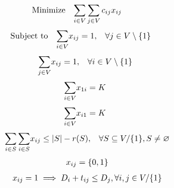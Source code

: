 \begin{equation}
    \begin{array}{ll@{}ll}
        \text{Minimize} & \displaystyle\sum\limits_{i \in V}\sum\limits_{j \in V} c_{ij}&x_{ij} &\\
    \end{array}
\end{equation}
\begin{equation}
    \begin{array}{ll@{}ll}
        \text{Subject to}&\displaystyle\sum\limits_{i \in V}   &x_{ij} = 1,  &\forall j \in V \setminus \{1\}\\
    \end{array}
\end{equation}
\begin{equation}
    \begin{array}{ll@{}ll}
        & \displaystyle\sum\limits_{j \in V}   &x_{ij} = 1,  &\forall i \in V \setminus \{1\}\\
    \end{array}
\end{equation}
\begin{equation}
    \begin{array}{ll@{}ll}
        & \displaystyle\sum\limits_{i \in V}   &x_{1i} = K\\
    \end{array}
\end{equation}
\begin{equation}
    \begin{array}{ll@{}ll}
        & \displaystyle\sum\limits_{i \in V}   &x_{i1} = K\\
    \end{array}
\end{equation}
\begin{equation}
    \begin{array}{ll@{}ll@{}ll}
        & \displaystyle\sum\limits_{i \in S}\sum\limits_{i \in S}  &x_{ij} \leq |S| - r(S), &\forall S \subseteq V/ \{1\} , S \neq \oldemptyset \\
    \end{array}
\end{equation}
\begin{equation}
    \begin{array}{ll@{}ll@{}ll}
        & x_{ij} = \{0,1\}\\
    \end{array}
\end{equation}
\begin{equation}
    \begin{array}{ll@{}ll@{}ll}
        & x_{ij} = 1 \implies D_{i} + t_{ij} \leq D_{j}, \forall i, j \in V / \{1\}
    \end{array}
\end{equation}
